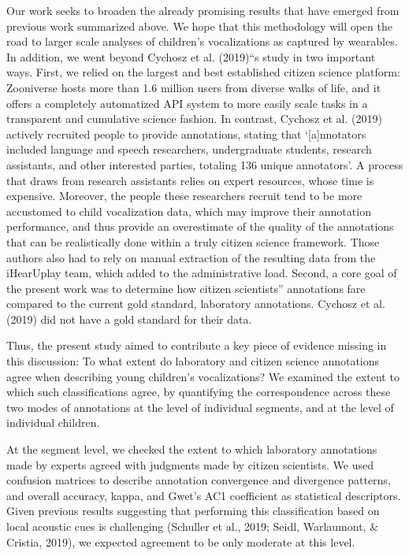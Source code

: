 \documentclass[english,,man]{apa6}
\begin{document}
Our work seeks to broaden the already promising results that have emerged from previous work summarized above. We hope that this methodology will open the road to larger scale analyses of children's vocalizations as captured by wearables. In addition, we went beyond Cychosz et al. (2019)\enquote{s study in two important ways. First, we relied on the largest and best established citizen science platform: Zooniverse hosts more than 1.6 million users from diverse walks of life, and it offers a completely automatized API system to more easily scale tasks in a transparent and cumulative science fashion. In contrast, Cychosz et al. (2019) actively recruited people to provide annotations, stating that \enquote{{[}a{]}nnotators included language and speech researchers, undergraduate students, research assistants, and other interested parties, totaling 136 unique annotators}. A process that draws from research assistants relies on expert resources, whose time is expensive. Moreover, the people these researchers recruit tend to be more accustomed to child vocalization data, which may improve their annotation performance, and thus provide an overestimate of the quality of the annotations that can be realistically done within a truly citizen science framework. Those authors also had to rely on manual extraction of the resulting data from the iHearUplay team, which added to the administrative load. Second, a core goal of the present work was to determine how citizen scientists} annotations fare compared to the current gold standard, laboratory annotations. Cychosz et al. (2019) did not have a gold standard for their data.

Thus, the present study aimed to contribute a key piece of evidence missing in this discussion: To what extent do laboratory and citizen science annotations agree when describing young children's vocalizations? We examined the extent to which such classifications agree, by quantifying the correspondence across these two modes of annotations at the level of individual segments, and at the level of individual children.

At the segment level, we checked the extent to which laboratory annotations made by experts agreed with judgments made by citizen scientists. We used confusion matrices to describe annotation convergence and divergence patterns, and overall accuracy, kappa, and Gwet's AC1 coefficient as statistical descriptors. Given previous results suggesting that performing this classification based on local acoustic cues is challenging (Schuller et al., 2019; Seidl, Warlaumont, \& Cristia, 2019), we expected agreement to be only moderate at this level.
\end{document}
